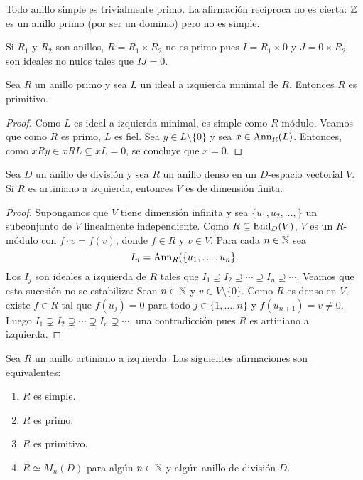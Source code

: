 \begin{example}
	Todo anillo simple es trivialmente primo. La afirmación recíproca no es
	cierta: $\mathbb{Z}$ es un anillo primo (por ser un dominio) pero no es simple.
\end{example}

\begin{example}
	Si $R_1$ y $R_2$ son anillos, $R=R_1\times R_2$ no es primo pues
	$I=R_1\times 0$ y $J=0\times R_2$ son ideales no nulos tales que $IJ=0$.
\end{example}

\begin{lemma}
	\label{lem:primoizqmin=>prim}
	Sea $R$ un anillo primo y sea $L$ un ideal a izquierda minimal de $R$.
	Entonces $R$ es primitivo.
\end{lemma}

\begin{proof}
	Como $L$ es ideal a izquierda minimal, es simple como $R$-módulo. Veamos
	que como $R$ es primo, $L$ es fiel. Sea $y\in L\setminus\{0\}$ y sea
	$x\in\operatorname{Ann}_R(L)$.  Entonces, como $xRy\in xRL\subseteq xL=0$, se concluye
	que $x=0$.
\end{proof}

\begin{lemma}
	\label{lem:denso_artiniano}
	Sea $D$ un anillo de división y sea $R$ un anillo denso en un
	$D$-espacio vectorial $V$. Si $R$ es artiniano a izquierda, 
	entonces $V$ es de dimensión finita.
\end{lemma}

\begin{proof}
	Supongamos que $V$ tiene dimensión infinita y sea $\{u_1,u_2,\dots,\}$ un
	subconjunto de $V$ linealmente independiente. Como $R\subseteq\operatorname{End}_D(V)$,
	$V$ es un $R$-módulo con $f\cdot v=f(v)$, donde $f\in R$ y $v\in V$. Para
	cada $n\in\mathbb{N}$ sea 
	\[
		I_n=\operatorname{Ann}_R(\{u_1,\dots,u_n\}.
	\]
	Los $I_j$ son ideales a izquierda de $R$ tales que $I_1\supseteq
	I_2\supseteq\cdots\supseteq I_n\supseteq\cdots$. Veamos que esta sucesión
	no se estabiliza: Sean $n\in\mathbb{N}$ y $v\in V\setminus\{0\}$. Como $R$ es denso
	en $V$, existe $f\in R$ tal que $f(u_j)=0$ para todo $j\in\{1,\dots,n\}$ y
	$f(u_{n+1})=v\ne0$. Luego $I_1\supsetneq I_2\supsetneq\cdots\supsetneq
	I_n\supsetneq\cdots$, una contradicción pues $R$ es artiniano a izquierda.
\end{proof}

\begin{theorem}[Wedderburn]
	Sea $R$ un anillo artiniano a izquierda. Las siguientes afirmaciones son
	equivalentes:
	\begin{enumerate}
		\item $R$ es simple.
		\item $R$ es primo.
		\item $R$ es primitivo.
		\item $R\simeq M_n(D)$ para algún $n\in\mathbb{N}$ y algún anillo de división $D$.
	\end{enumerate}
\end{theorem}

